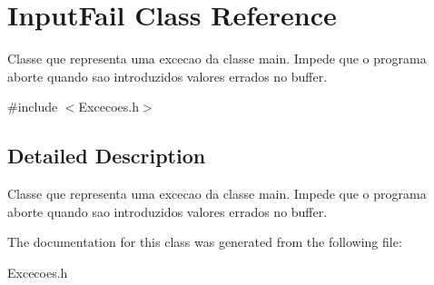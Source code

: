 \hypertarget{class_input_fail}{}\section{Input\+Fail Class Reference}
\label{class_input_fail}


Classe que representa uma excecao da classe main. Impede que o programa aborte quando sao introduzidos valores errados no buffer.  




{\ttfamily \#include $<$Excecoes.\+h$>$}



\subsection{Detailed Description}
Classe que representa uma excecao da classe main. Impede que o programa aborte quando sao introduzidos valores errados no buffer. 

The documentation for this class was generated from the following file\+:\begin{DoxyCompactItemize}
\item 
Excecoes.\+h\end{DoxyCompactItemize}
